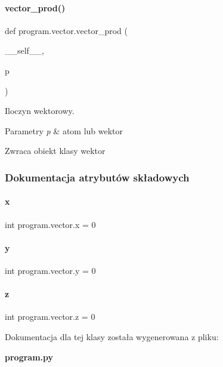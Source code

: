 \paragraph{vector\+\_\+prod()}
{\footnotesize\ttfamily def program.\+vector.\+vector\+\_\+prod (\begin{DoxyParamCaption}\item[{}]{\+\_\+\+\_\+self\+\_\+\+\_\+,  }\item[{}]{p }\end{DoxyParamCaption})}



Iloczyn wektorowy. 


\begin{DoxyParams}{Parametry}
{\em p} & atom lub wektor \\
\hline
\end{DoxyParams}
\begin{DoxyReturn}{Zwraca}
obiekt klasy wektor 
\end{DoxyReturn}


\subsubsection{Dokumentacja atrybutów składowych}
\mbox{\label{classprogram_1_1vector_a8e8d3279e72898c00c453b3a038bf7f3}} 
\paragraph{x}
{\footnotesize\ttfamily int program.\+vector.\+x = 0\hspace{0.3cm}{\ttfamily [static]}}

\mbox{\label{classprogram_1_1vector_a011d4c6e53686a99dcf935948b47b9a7}} 
\paragraph{y}
{\footnotesize\ttfamily int program.\+vector.\+y = 0\hspace{0.3cm}{\ttfamily [static]}}

\mbox{\label{classprogram_1_1vector_a5026a54da2bf711a00851846800aa294}} 
\paragraph{z}
{\footnotesize\ttfamily int program.\+vector.\+z = 0\hspace{0.3cm}{\ttfamily [static]}}



Dokumentacja dla tej klasy została wygenerowana z pliku\+:\begin{DoxyCompactItemize}
\item 
\textbf{ program.\+py}\end{DoxyCompactItemize}
